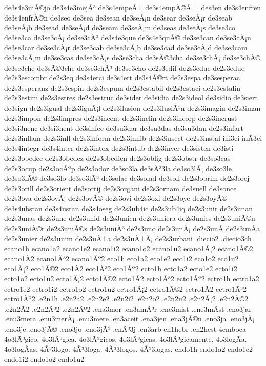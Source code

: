 {de3s4e3mÃ©jo
de3s4e3mejÃ³
de3s4empeÃ±
de3s4empÃ©Ã±
.des3en
de3s4enfren
de3s4enfrÃ©n
de3seo
de3sea
de3sean
de3seÃ¡n
de3sear
de3seÃ¡r
de3seab
de3seÃ¡b
de3sead
de3seÃ¡d
de3seam
de3seÃ¡m
de3seas
de3seÃ¡s
de3se3co
de3se3ca
de3se3cÃ¡
de3se3cÃ³
de3s4e3que
de3s4e3quÃ©
de3se3can
de3se3cÃ¡n
de3se3car
de3se3cÃ¡r
de3se3cab
de3se3cÃ¡b
de3se3cad
de3se3cÃ¡d
de3se3cam
de3se3cÃ¡m
de3se3cas
de3se3cÃ¡s
de3se3cha
de3sÃ©3cha
de3se3chÃ¡
de3se3chÃ©
de3se3che
de3sÃ©3che
de3se3chÃ³
de3se3cho
de2s3edif
de2s3educ
de2s3eduq
de2s3escombr
de2s3eq
de3s4erci
de3s4ert
de3s4Ã©rt
de2s3espa
de3sesperac
de2s3esperanz
de2s3espin
de2s3espum
de2s3estabil
de2s3estaci
de2s3estalin
de2s3estim
de2s3estres
de2s3estruc
de3sider
de3sidia
de2s3ideol
de3sidio
de3siert
de3sign
de2s3igual
de2s3iguÃ¡l
de2s3ilusion
de2s3ilusiÃ³n
de2s3imagin
de2s3iman
de2s3impon
de2s3impres
de2s3incent
de2s3inclin
de2s3incorp
de2s3incrust
de3si3nenc
de3si3nent
de3sinfec
de3su3dar
de3su3das
de3su3dan
de2s3infart
de2s3inflam
de2s3infl
de2s3inform
de2s3inhib
de2s3insect
de2s3instal
ini3ci
inÃ­3ci
de3s4integr
de3s4inter
de2s3intox
de2s3intub
de2s3inver
de3sisten
de3isti
de2s3obedec
de2s3obedez
de2s3obedien
de2s3oblig
de2s3obstr
de3so3cas
de2s3ocup
de2s3ocÃºp
de2s3odor
de3so3la
de3sÃ³3la
de3so3lÃ¡
de3so3le
de3so3lÃ©
de3so3lo
de3so3lÃ³
de3solac
de3solad
de3soll
de2s3oprim
de2s3orej
de2s3orill
de2s3orient
de3sortij
de2s3organi
de2s3ornam
de3suell
de3sonce
de2s3ova
de2s3ovÃ¡
de2s3ovÃ©
de2s3ovi
de2s3oxi
de2s3oye
de2s3oyÃ©
de3s4ubstan
de3s4ustan
de3s4oseg
de2s3ub4ic
de2s3ub4iq
de2s3unir
de2s3unan
de2s3unas
de2s3une
de2s3unid
de2s3unien
de2s3uniera
de2s3unies
de2s3uniÃ©n
de2s3uniÃ©r
de2s3uniÃ©s
de2s3uniÃ³
de2s3uno
de2s3unÃ¡
de2s3unÃ­
de2s3unÃ­a
de2s3unier
de2s3unim
de2s3uÃ±a
de2s3uÃ±Ã¡
de2s3urbani
.diecio2
.diecio3ch
ecano1h
ecano1a2 ecano1e2 ecano1i2 ecano1o2 ecano1u2
ecano1Ã¡2 ecano1Ã©2 ecano1Ã­2 ecano1Ã³2 ecano1Ãº2
eco1h
eco1a2 eco1e2 eco1i2 eco1o2 eco1u2
eco1Ã¡2 eco1Ã©2 eco1Ã­2 eco1Ã³2 eco1Ãº2
ecto1h
ecto1a2 ecto1e2 ecto1i2 ecto1o2 ecto1u2
ecto1Ã¡2 ecto1Ã©2 ecto1Ã­2 ecto1Ã³2 ecto1Ãº2
ectro1h
ectro1a2 ectro1e2 ectro1i2 ectro1o2 ectro1u2
ectro1Ã¡2 ectro1Ã©2 ectro1Ã­2 ectro1Ã³2 ectro1Ãº2
.e2n1h
.e2n2a2 .e2n2e2 .e2n2i2 .e2n2o2 .e2n2u2
.e2n2Ã¡2 .e2n2Ã©2 .e2n2Ã­2 .e2n2Ã³2 .e2n2Ãº2
.ena3mor
.en3amÃ³r
.ene3mist
.ene3mÃ­st
.eno3jar
.enu3mera
.enu3merÃ¡
.enu3mere
.en3aceit
.ena3jen
.ena3jÃ©n
.eno3ja
.eno3jÃ¡
.eno3je
.eno3jÃ©
.eno3jo
.eno3jÃ³
.enÃ³3j
.en3arb
en1hebr
.en2hest
4emboca
4o3lÃ³gico.
4o3lÃ³gica.
4o3lÃ³gicos.
4o3lÃ³gicas.
4o3lÃ³gicamente.
4o3logÃ­a.
4o3logÃ­as.
4Ã³3logo.
4Ã³3loga.
4Ã³3logos.
4Ã³3logas.
endo1h
endo1a2 endo1e2 endo1i2 endo1o2 endo1u2
}
